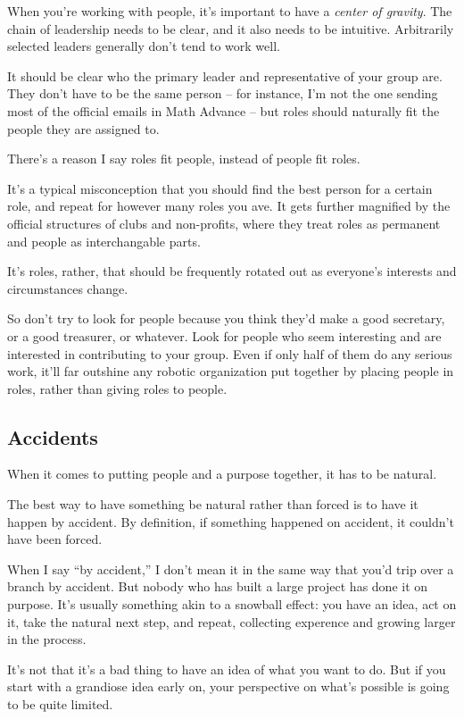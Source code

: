 \documentclass[points=false]{bounce}
\begin{document}
When you're working with people,
it's important to have a \emph{center of gravity}.
The chain of leadership needs to be clear, and it also needs to be intuitive. Arbitrarily selected leaders generally don't tend to work well.

It should be clear who the primary leader and representative of your group are. They don't have to be the same person -- for instance, I'm not the one sending most of the official emails in Math Advance -- but roles should naturally fit the people they are assigned to.

There's a reason I say roles fit people, instead of people fit roles.

It's a typical misconception that you should find the best person for a certain role, and repeat for however many roles you ave.
It gets further magnified by the official structures of clubs and non-profits, where they treat roles as permanent and people as interchangable parts.

It's roles, rather, that should be frequently rotated out as everyone's interests and circumstances change.

So don't try to look for people because you think they'd make a good secretary, or a good treasurer, or whatever. Look for people who seem interesting and are interested in contributing to your group. Even if only half of them do any serious work, it'll far outshine any robotic organization put together by placing people in roles, rather than giving roles to people.

\subsection{Accidents}

When it comes to putting people and a purpose together,
it has to be natural.

The best way to have something be natural rather than forced
is to have it happen by accident.
By definition, if something happened on accident,
it couldn't have been forced.

When I say ``by accident,'' I don't mean it in the same way
that you'd trip over a branch by accident.
But nobody who has built a large project
has done it on purpose.
It's usually something akin to a snowball effect:
you have an idea, act on it, take the natural next step,
and repeat, collecting experence and growing larger in the process.

It's not that it's a bad thing to have an idea of what you want to do.
But if you start with a grandiose idea early on,
your perspective on what's possible is going to be quite limited.
\end{document}
